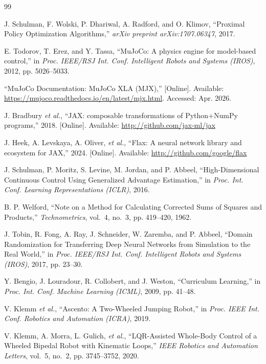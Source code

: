 \documentclass[conference]{IEEEtran}
\begin{document}

\begin{thebibliography}{99}

J. Schulman, F. Wolski, P. Dhariwal, A. Radford, and O. Klimov,
``Proximal Policy Optimization Algorithms,''
\emph{arXiv preprint arXiv:1707.06347}, 2017.

E. Todorov, T. Erez, and Y. Tassa,
``MuJoCo: A physics engine for model-based control,''
in \emph{Proc. IEEE/RSJ Int. Conf. Intelligent Robots and Systems (IROS)},
2012, pp. 5026--5033.

``MuJoCo Documentation: MuJoCo XLA (MJX),''
[Online]. Available:
\url{https://mujoco.readthedocs.io/en/latest/mjx.html}.
Accessed: Apr. 2026.

J. Bradbury \emph{et al.},
``JAX: composable transformations of Python+NumPy programs,''
2018. [Online]. Available: \url{http://github.com/jax-ml/jax}

J. Heek, A. Levskaya, A. Oliver, \emph{et al.},
``Flax: A neural network library and ecosystem for JAX,''
2024. [Online]. Available: \url{http://github.com/google/flax}

J. Schulman, P. Moritz, S. Levine, M. Jordan, and P. Abbeel,
``High-Dimensional Continuous Control Using Generalized Advantage
Estimation,''
in \emph{Proc. Int. Conf. Learning Representations (ICLR)}, 2016.

B. P. Welford,
``Note on a Method for Calculating Corrected Sums of Squares
and Products,''
\emph{Technometrics}, vol.~4, no.~3, pp. 419--420, 1962.

J. Tobin, R. Fong, A. Ray, J. Schneider, W. Zaremba, and P. Abbeel,
``Domain Randomization for Transferring Deep Neural Networks from
Simulation to the Real World,''
in \emph{Proc. IEEE/RSJ Int. Conf. Intelligent Robots and Systems (IROS)},
2017, pp. 23--30.

Y. Bengio, J. Louradour, R. Collobert, and J. Weston,
``Curriculum Learning,''
in \emph{Proc. Int. Conf. Machine Learning (ICML)}, 2009, pp. 41--48.

V. Klemm \emph{et al.},
``Ascento: A Two-Wheeled Jumping Robot,''
in \emph{Proc. IEEE Int. Conf. Robotics and Automation (ICRA)}, 2019.

V. Klemm, A. Morra, L. Gulich, \emph{et al.},
``LQR-Assisted Whole-Body Control of a Wheeled Bipedal Robot
with Kinematic Loops,''
\emph{IEEE Robotics and Automation Letters},
vol.~5, no.~2, pp. 3745--3752, 2020.


\end{thebibliography}
\end{document}
